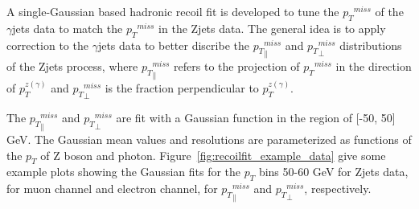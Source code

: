 \vspace{0.3cm}
A single-Gaussian based hadronic recoil fit is developed to tune the ${p_{T}}^{miss}$ of the $\gamma$jets data to match the ${p_{T}}^{miss}$ in the Zjets data. The general idea is to apply correction to the $\gamma$jets data to better discribe the ${p_{T}}^{miss}_\parallel$ and ${p_{T}}^{miss}_\perp$ distributions of the Zjets process, where ${p_{T}}^{miss}_\parallel$ refers to the projection of ${p_{T}}^{miss}$ in the direction of ${p}_{T}^{z(\gamma)}$ and ${p_{T}}^{miss}_\perp$ is the fraction perpendicular to ${p}_{T}^{z(\gamma)}$. 

\vspace{0.3cm}
The ${p_{T}}^{miss}_\parallel$ and ${p_{T}}^{miss}_\perp$ are fit with a Gaussian function in the region of [-50, 50] GeV. The Gaussian mean values and resolutions are parameterized as functions of the $p_T$ of Z boson and photon. Figure~\ref{fig:recoilfit_example_data} give some example plots showing the Gaussian fits for the $p_T$ bins 50-60 GeV for Zjets data, for muon channel and electron channel, for ${p_{T}}^{miss}_\parallel$ and ${p_{T}}^{miss}_\perp$, respectively.

